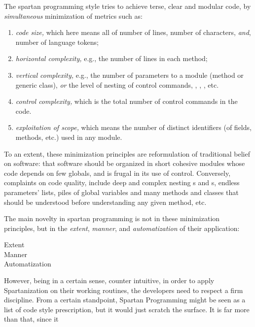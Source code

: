 The spartan programming style tries to achieve terse, clear and modular code,
by \textit{simultaneous} minimization of metrics such as:
\begin{enumerate}
  \item \textit{code size,} which here means all of number of lines, number of
    characters, \emph{and}, number of language tokens;
  \item \textit{horizontal complexity,}  e.g., the number of lines in each
    method;
  \item \textit{vertical complexity,}  e.g., the number of parameters to a
    module (method or generic class), \emph{or} the level of nesting of control
    commands, , , , etc.
  \item \textit{control complexity,} which is the total number of control
    commands in the code.
  \item \textit{exploitation of scope,} which means the number of distinct
    identifiers (of fields, methods, etc.) used in any module. 
\end{enumerate}

To an extent, these minimization principles are reformulation of traditional
belief on software: that software should be organized in short cohesive modules
whose code depends on few globals, and is frugal in its use of control.
Conversely, complaints on code quality, include deep and complex nesting
s and s, endless parameters' lists, piles of global variables
and many methods and classes that should be understood before understanding any
given method, etc.

The main novelty in spartan programming is not in these minimization
principles, but in the \emph{extent}, \emph{manner}, and \emph{automatization}
of their application: 

\begin{description}
  \item[Extent]
  \item[Manner]
  \item[Automatization]
\end{description}


However, being in a certain sense, counter intuitive, in order to apply
Spartanization on their working routines, the developers need to respect a firm
discipline. From a certain standpoint, Spartan Programming might be seen as a
list of code style prescription, but it would just scratch the surface. It is
far more than that, since it

